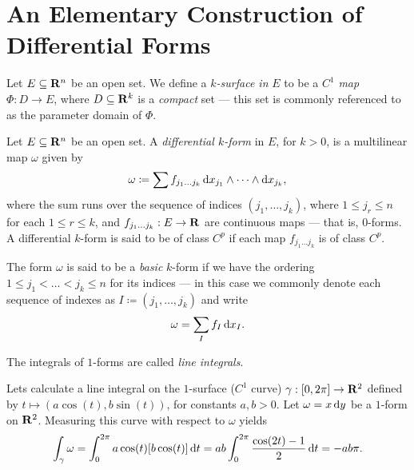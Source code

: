 \section{An Elementary Construction of Differential Forms}

\begin{definition}[\(k\)-surface]
    \label{def:k-surface-Rn}
    Let \(E \subseteq \mathbf{R}^n\) be an open set. We define a \emph{\(k\)-surface in}
    \(E\) to be a \(C^1\) \emph{map} \(\Phi: D \to E\), where \(D \subseteq \mathbf{R}^k\)
    is a \emph{compact} set --- this set is commonly referenced to as the parameter
    domain of \(\Phi\).
\end{definition}

\begin{definition}
    Let \(E \subseteq \mathbf{R}^n\) be an open set. A \emph{differential \(k\)-form} in
    \(E\), for \(k > 0\), is a multilinear map \(\omega\) given by
    \[
        \omega \coloneq \sum f_{j_1 \dots j_k}\,
        \mathrm{d} x_{j_1} \wedge \dots \wedge \mathrm{d} x_{j_k},
    \]
    where the sum runs over the sequence of indices \((j_1, \dots, j_k)\), where \(1
    \leq j_r \leq n\) for each \(1 \leq r \leq k\), and \(f_{j_1 \dots j_k}: E \to
    \mathbf{R}\) are continuous maps --- that is, \(0\)-forms. A differential \(k\)-form is
    said to be of class \(C^p\) if each map \(f_{j_1 \dots j_k}\) is of class
    \(C^p\).

    The form \(\omega\) is said to be a \emph{basic} \(k\)-form if we have the
    ordering \(1 \leq j_1 < \dots < j_k \leq n\) for its indices --- in this case we
    commonly denote each sequence of indexes as \(I \coloneq (j_1, \dots, j_k)\) and
    write
    \[
        \omega = \sum_I f_{I}\, \mathrm{d} x_{I}.
    \]
\end{definition}

\begin{definition}
    \label{def:line-integral}
    The integrals of \(1\)-forms are called \emph{line integrals}.
\end{definition}

\begin{example}
    Lets calculate a line integral on the \(1\)-surface (\(C^1\) curve)
    \(\gamma: [0, 2 \pi] \to \mathbf{R}^2\) defined by \(t \mapsto (a \cos(t), b \sin(t))\),
    for constants \(a, b > 0\). Let \(\omega = x\, \mathrm{d} y\) be a \(1\)-form on
    \(\mathbf{R}^2\). Measuring this curve with respect to \(\omega\) yields
    \[
        \int_{\gamma} \omega = \int_0^{2\pi} a \cos(t) [b \cos(t)]\, \mathrm{d} t
        = ab \int_0^{2 \pi} \frac{\cos(2t) - 1}{2}\, \mathrm{d} t = - ab \pi.
    \]
\end{example}

